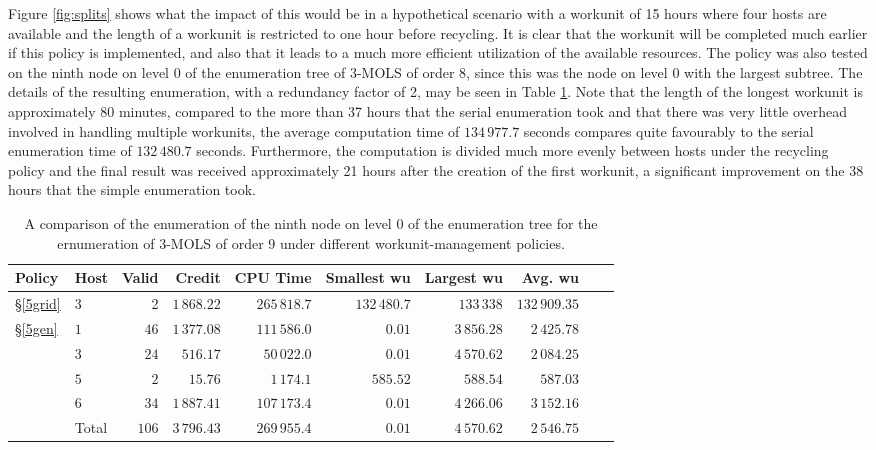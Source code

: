 Figure \ref{fig:splits} shows what the impact of this would be in a hypothetical scenario with a workunit of 15 hours where four hosts are available and the length of a workunit is restricted to one hour before recycling. It is clear that the workunit will be completed much earlier if this policy is implemented, and also that it leads to a much more efficient utilization   of the available resources. The policy was also tested on the ninth node on level 0 of the enumeration tree of 3-MOLS of order 8, since this was the node on level 0 with the largest subtree. The details of the resulting enumeration, with a redundancy factor of 2, may be seen in Table \ref{839splits}. Note that the length of the longest workunit is approximately 80 minutes, compared to the more than 37 hours that the serial enumeration took and that there was very little overhead involved in handling multiple workunits, the average computation time of $134\,977.7$ seconds compares quite favourably to the serial enumeration time of $132\,480.7$ seconds. Furthermore, the computation is divided much more evenly between hosts under the recycling policy and the final result was received approximately 21 hours after the creation of the first workunit, a significant improvement on the 38 hours that the simple enumeration took.
\begin{table}[t]
 \centering
 \caption{A comparison of the enumeration of the ninth node on level 0 of the enumeration tree for the ernumeration of 3-MOLS of order 9 under different workunit-management policies.}
\begin{tabular}{llrrrrrrrr}
\toprule
Policy & Host   & Valid   & Credit   & CPU Time& Smallest wu & Largest wu& Avg. wu\\ \midrule
\S\ref{5grid} & 3 & 2 & $1\,868.22$ & $265\,818.7$ & $132\,480.7$ &$133\,338$& $132\,909.35$\\ \midrule
\multirow{5}{2cm}{\S\ref{5gen}} &$1$   & $46$  & $1\,377.08$ & $111\,586.0$ & $0.01$ & $3\,856.28$ & $2\,425.78$ \\
&$3$   & $24$  & $516.17$ & $50\,022.0$ & $0.01$ & $4\,570.62$ & $2\,084.25$ \\
&$5$   & $2$   & $15.76$ & $1\,174.1$ & $585.52$ & $588.54$ & $587.03$ \\
&$6$   & $34$  & $1\,887.41$ & $107\,173.4$ & $0.01$ & $4\,266.06$ & $3\,152.16$ \\ \cmidrule{2-8}
& Total   & $106$  & $3\,796.43$& $269\,955.4$ & $0.01$& $4\,570.62$ & $2\,546.75$\\ \bottomrule
\end{tabular}\vspace*{-.4cm}
\label{839splits}
\end{table}

